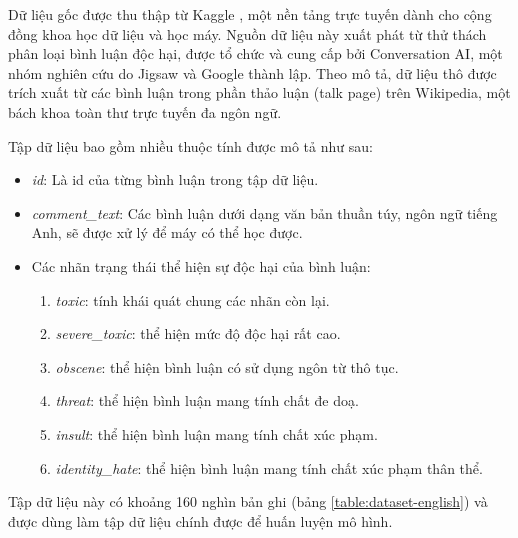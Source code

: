 Dữ liệu gốc được thu thập từ Kaggle \cite{jigsaw-toxic-comment-classification-challenge}, một nền tảng trực tuyến dành cho cộng đồng khoa học dữ liệu và học máy. Nguồn dữ liệu này xuất phát từ thử thách phân loại bình luận độc hại, được tổ chức và cung cấp bởi Conversation AI, một nhóm nghiên cứu do Jigsaw và Google thành lập. Theo mô tả, dữ liệu thô được trích xuất từ các bình luận trong phần thảo luận (talk page) trên Wikipedia, một bách khoa toàn thư trực tuyến đa ngôn ngữ.

Tập dữ liệu bao gồm nhiều thuộc tính được mô tả như sau:
\begin{itemize}
    \item \textit{id}: Là id của từng bình luận trong tập dữ liệu.
    \item \textit{comment\_text}: Các bình luận dưới dạng văn bản thuần túy, ngôn ngữ tiếng Anh, sẽ được xử lý để máy có thể học được.
    \item Các nhãn trạng thái thể hiện sự độc hại của bình luận:
          \begin{enumerate}
              \item \textit{toxic}: tính khái quát chung các nhãn còn lại.
              \item \textit{severe\_toxic}: thể hiện mức độ độc hại rất cao.
              \item \textit{obscene}: thể hiện bình luận có sử dụng ngôn từ thô tục.
              \item \textit{threat}: thể hiện bình luận mang tính chất đe doạ.
              \item \textit{insult}: thể hiện bình luận mang tính chất xúc phạm.
              \item \textit{identity\_hate}: thể hiện bình luận mang tính chất xúc phạm thân thể.
          \end{enumerate}
\end{itemize}

Tập dữ liệu này có khoảng 160 nghìn bản ghi (bảng \ref{table:dataset-english}) và được dùng làm tập dữ liệu chính được để huấn luyện mô hình.
